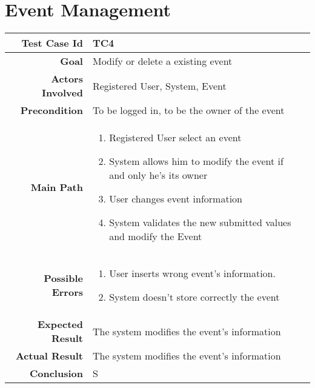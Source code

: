 \section{Event Management}
\begin{tabularx}{\linewidth}{|r|X|X|}

  \hline   {\bf Test Case Id} &  TC4\\
  \hline  {\bf Goal} & Modify or delete a existing event\\
  \hline  {\bf Actors Involved} & Registered User, System, Event\\
  \hline  {\bf Precondition} & To be logged in, to be the owner of the event\\ 
   \hline  {\bf Main Path} & \begin{enumerate} 
   \item Registered User select an event
   \item System allows him to modify the event if and only he's its owner
   \item User changes event information
    \item System validates the new submitted values and modify the Event
   \end{enumerate}\\
   \hline  {\bf Possible Errors} & \begin{enumerate} 
   \item User inserts wrong event's information.
   \item System doesn't store correctly the event
   \end{enumerate}\\
  \hline  {\bf Expected Result} & The system modifies the event's information\\
  \hline  {\bf Actual Result} & The system modifies the event's information\\
  \hline  {\bf Conclusion} & S\\
  \hline
  
\end{tabularx}

